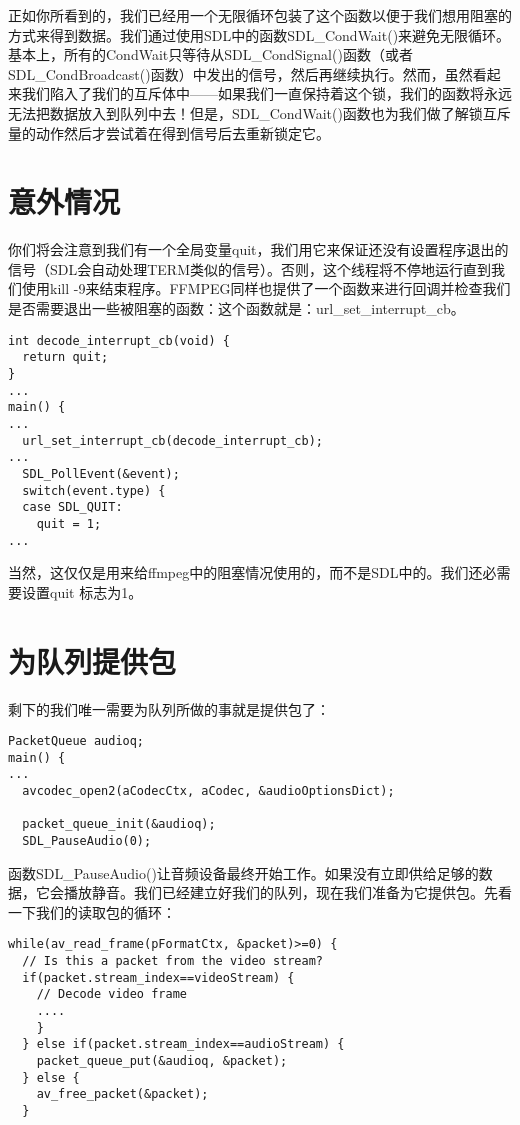 正如你所看到的，我们已经用一个无限循环包装了这个函数以便于我们想用阻塞的方式来得到数据。我们通过使用SDL中的函数SDL_CondWait()来避免无限循环。基本上，所有的CondWait只等待从SDL_CondSignal()函数（或者SDL_CondBroadcast()函数）中发出的信号，然后再继续执行。然而，虽然看起来我们陷入了我们的互斥体中——如果我们一直保持着这个锁，我们的函数将永远无法把数据放入到队列中去！但是，SDL_CondWait()函数也为我们做了解锁互斥量的动作然后才尝试着在得到信号后去重新锁定它。

\section{意外情况}

你们将会注意到我们有一个全局变量quit，我们用它来保证还没有设置程序退出的信号（SDL会自动处理TERM类似的信号）。否则，这个线程将不停地运行直到我们使用kill -9来结束程序。FFMPEG同样也提供了一个函数来进行回调并检查我们是否需要退出一些被阻塞的函数：这个函数就是：url_set_interrupt_cb。

\begin{lstlisting}
int decode_interrupt_cb(void) {
  return quit;
}
...
main() {
...
  url_set_interrupt_cb(decode_interrupt_cb);
...
  SDL_PollEvent(&event);
  switch(event.type) {
  case SDL_QUIT:
    quit = 1;
...
\end{lstlisting}

当然，这仅仅是用来给ffmpeg中的阻塞情况使用的，而不是SDL中的。我们还必需要设置quit 标志为1。

\section{为队列提供包}


剩下的我们唯一需要为队列所做的事就是提供包了：

\begin{lstlisting}
PacketQueue audioq;
main() {
...
  avcodec_open2(aCodecCtx, aCodec, &audioOptionsDict);

  packet_queue_init(&audioq);
  SDL_PauseAudio(0);
\end{lstlisting}

函数SDL_PauseAudio()让音频设备最终开始工作。如果没有立即供给足够的数据，它会播放静音。我们已经建立好我们的队列，现在我们准备为它提供包。先看一下我们的读取包的循环：

\begin{lstlisting}
while(av_read_frame(pFormatCtx, &packet)>=0) {
  // Is this a packet from the video stream?
  if(packet.stream_index==videoStream) {
    // Decode video frame
    ....
    }
  } else if(packet.stream_index==audioStream) {
    packet_queue_put(&audioq, &packet);
  } else {
    av_free_packet(&packet);
  }
\end{lstlisting}

